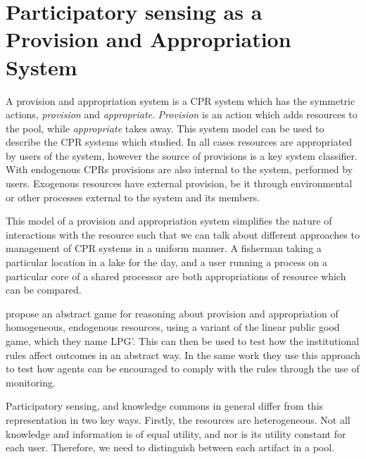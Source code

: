 
\section{Participatory sensing as a Provision and Appropriation System}

A provision and appropriation system is a \ac{CPR} system which has the
symmetric actions, \emph{provision} and \emph{appropriate}. \emph{Provision}
is an action which adds resources to the pool, while \emph{appropriate} takes
away. This system model can be used to describe the \ac{CPR} systems which
\citet{Ostrom1990} studied. In all cases resources are appropriated by users
of the system, however the source of provisions is a key system classifier.
With endogenous \acp{CPR} provisions are also internal to the system,
performed by users. Exogenous resources have external provision, be it through
environmental or other processes external to the system and its members.

This model of a provision and appropriation system simplifies the nature of
interactions with the resource such that we can talk about different
approaches to management of \ac{CPR} systems in a uniform manner. A fisherman
taking a particular location in a lake for the day, and a user running a
process on a particular core of a shared processor are both appropriations of
resource which can be compared.

\citet{Pitt2012c} propose an abstract game for reasoning about provision and
appropriation of homogeneous, endogenous resources, using a variant of the
linear public good game, which they name LPG'. This can then be used to test
how the institutional rules affect outcomes in an abstract way. In the same
work they use this approach to test how agents can be encouraged to comply
with the rules through the use of monitoring.

Participatory sensing, and knowledge commons in general differ from this
representation in two key ways. Firstly, the resources are heterogeneous. Not
all knowledge and information is of equal utility, and nor is its utility
constant for each user. Therefore, we need to distinguish between each
artifact in a pool.

